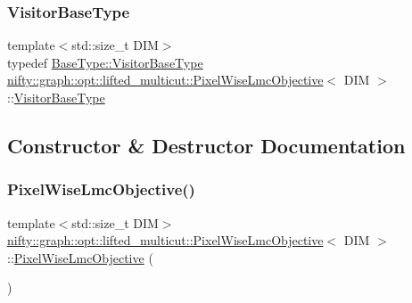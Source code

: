 \subsubsection{\texorpdfstring{Visitor\+Base\+Type}{VisitorBaseType}}
{\footnotesize\ttfamily template$<$std\+::size\+\_\+t D\+IM$>$ \\
typedef \hyperlink{classnifty_1_1graph_1_1opt_1_1common_1_1SolverBase_ad9932afb08dd17d375de4b15da9ffaa6}{Base\+Type\+::\+Visitor\+Base\+Type} \hyperlink{classnifty_1_1graph_1_1opt_1_1lifted__multicut_1_1PixelWiseLmcObjective}{nifty\+::graph\+::opt\+::lifted\+\_\+multicut\+::\+Pixel\+Wise\+Lmc\+Objective}$<$ D\+IM $>$\+::\hyperlink{classnifty_1_1graph_1_1opt_1_1lifted__multicut_1_1PixelWiseLmcObjective_a980f38de550a4b5e49ca2d0e93a3883c}{Visitor\+Base\+Type}}



\subsection{Constructor \& Destructor Documentation}
\mbox{\label{classnifty_1_1graph_1_1opt_1_1lifted__multicut_1_1PixelWiseLmcObjective_a9ca29aebe51f087b87d9353b72e5b4f3}} 
\subsubsection{\texorpdfstring{Pixel\+Wise\+Lmc\+Objective()}{PixelWiseLmcObjective()}\hspace{0.1cm}{\footnotesize\ttfamily [1/4]}}
{\footnotesize\ttfamily template$<$std\+::size\+\_\+t D\+IM$>$ \\
\hyperlink{classnifty_1_1graph_1_1opt_1_1lifted__multicut_1_1PixelWiseLmcObjective}{nifty\+::graph\+::opt\+::lifted\+\_\+multicut\+::\+Pixel\+Wise\+Lmc\+Objective}$<$ D\+IM $>$\+::\hyperlink{classnifty_1_1graph_1_1opt_1_1lifted__multicut_1_1PixelWiseLmcObjective}{Pixel\+Wise\+Lmc\+Objective} (\begin{DoxyParamCaption}{ }\end{DoxyParamCaption})\hspace{0.3cm}{\ttfamily [inline]}}

